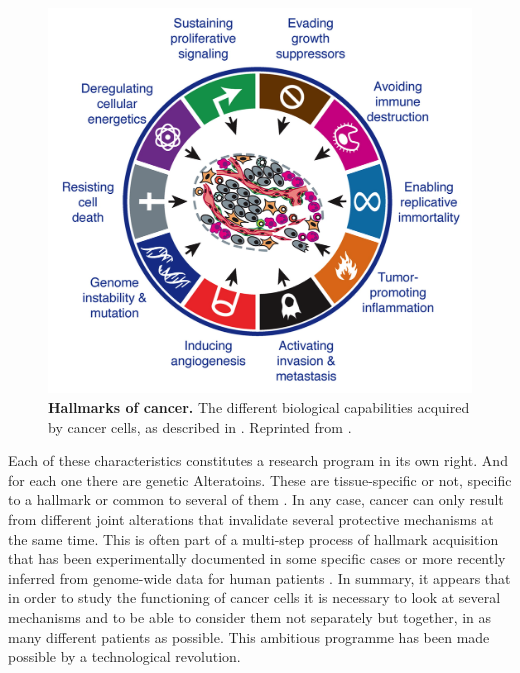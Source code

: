 \documentclass[a4paper,12pt,twoside,onecolumn,openright,final,oldfontcommands]{memoir}
\begin{document}
\begin{figure}

{\centering \includegraphics[width=0.9\linewidth]{fig/hallmarks} 

}

\caption[Hallmarks of cancer]{\textbf{Hallmarks of cancer.} The different
biological capabilities acquired by cancer cells, as described in
\citet{hanahan2000hallmarks}. Reprinted from
\citet{hanahan2011hallmarks}.}\label{fig:hallmarks}
\end{figure}






Each of these characteristics constitutes a research program in its own
right. And for each one there are genetic Alteratoins. These are
tissue-specific or not, specific to a hallmark or common to several of
them \citep{hanahan2000hallmarks}. In any case, cancer can only result
from different joint alterations that invalidate several protective
mechanisms at the same time. This is often part of a multi-step process
of hallmark acquisition that has been experimentally documented in some
specific cases \citep{hahn1999creation} or more recently inferred from
genome-wide data for human patients \citep{tomasetti2015only}. In
summary, it appears that in order to study the functioning of cancer
cells it is necessary to look at several mechanisms and to be able to
consider them not separately but together, in as many different patients
as possible. This ambitious programme has been made possible by a
technological revolution.
\end{document}
